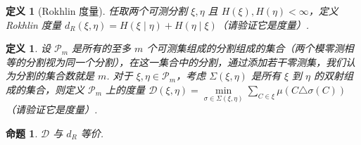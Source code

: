 \documentclass[11pt, a4paper, oneside]{ctexart}
\newtheorem{definition}[theorem]{定义}
\newtheorem{proposition}[theorem]{命题}
\newcommand{\cD}{\mathcal{D}}
\newcommand{\cP}{\mathcal{P}}
\begin{document}
    \begin{definition}[Rokhlin 度量]
        任取两个可测分割 $\xi,\eta$ 且 $H(\xi),H(\eta)<\infty$，定义 Rokhlin 度量 $d_R(\xi,\eta)=H(\xi\mid\eta)+H(\eta\mid\xi)$（请验证它是度量）.
    \end{definition}
    \begin{definition}
        设 $\cP_m$ 是所有的至多 $m$ 个可测集组成的分割组成的集合（两个模零测相等的分割视为同一个分割），在这一集合中的分割，通过添加若干零测集，我们认为分割的集合数就是 $m$. 对于 $\xi,\eta\in\cP_m$，考虑 $\Sigma(\xi,\eta)$ 是所有 $\xi$ 到 $\eta$ 的双射组成的集合，则定义 $\cP_m$ 上的度量 $\cD(\xi,\eta)=\min\limits_{\sigma\in \Sigma(\xi,\eta)}\sum\limits_{C\in \xi}\mu(C\triangle \sigma(C))$（请验证它是度量）.
    \end{definition}
    \begin{proposition}
        $\cD$ 与 $d_R$ 等价.
    \end{proposition}
\end{document}
